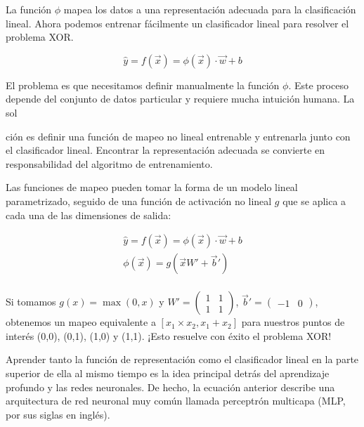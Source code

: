 La función $\phi$ mapea los datos a una representación adecuada para la clasificación lineal. Ahora podemos entrenar fácilmente un clasificador lineal para resolver el problema XOR.

\begin{equation}
\hat{y} = f(\vec{x}) = \phi(\vec{x}) \cdot \vec{w} + b
\end{equation}

El problema es que necesitamos definir manualmente la función $\phi$. Este proceso depende del conjunto de datos particular y requiere mucha intuición humana. La sol

ción es definir una función de mapeo no lineal entrenable y entrenarla junto con el clasificador lineal. Encontrar la representación adecuada se convierte en responsabilidad del algoritmo de entrenamiento.

Las funciones de mapeo pueden tomar la forma de un modelo lineal parametrizado, seguido de una función de activación no lineal $g$ que se aplica a cada una de las dimensiones de salida:

\begin{equation}
\begin{split}
\hat{y} = f(\vec{x}) = \phi(\vec{x}) \cdot \vec{w} + b \\
\phi(\vec{x}) = g(\vec{x}W' + \vec{b}') \\
\end{split}
\end{equation}

Si tomamos $g(x) = \operatorname{max}(0, x)$ y $W' = \begin{pmatrix}
    1 & 1 \\ 1 & 1 \end{pmatrix}$, $\vec{b}' = \begin{pmatrix}
    -1 & 0 \end{pmatrix}$, obtenemos un mapeo equivalente a $[x_1 \times x_2, x_1 + x_2]$ para nuestros puntos de interés (0,0), (0,1), (1,0) y (1,1). ¡Esto resuelve con éxito el problema XOR!

Aprender tanto la función de representación como el clasificador lineal en la parte superior de ella al mismo tiempo es la idea principal detrás del aprendizaje profundo y las redes neuronales. De hecho, la ecuación anterior describe una arquitectura de red neuronal muy común llamada perceptrón multicapa (MLP, por sus siglas en inglés).
